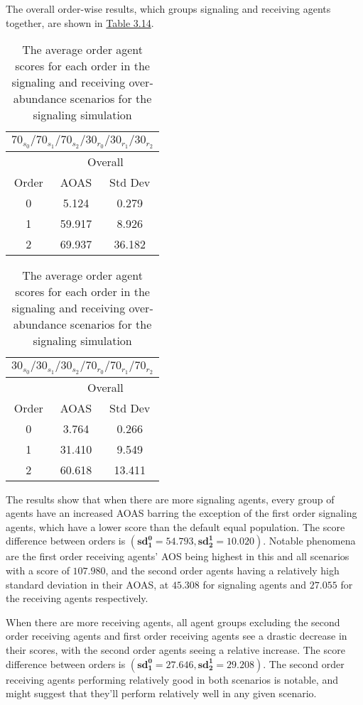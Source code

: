 The overall order-wise results, which groups signaling and receiving agents together, are shown in \hyperref[table:sig-overall]{Table 3.14}.

\begin{table}[h]
    \centering
    \begin{tabular}{|c|c|c|}
    \hline
    \multicolumn{3}{|c|}{$70_{s_{0}}/70_{s_{1}}/70_{s_{2}}/30_{r_{0}}/30_{r_{1}}/30_{r_{2}}$} \\
    \hline
    \multicolumn{1}{|c|}{} & \multicolumn{2}{|c|}{Overall} \\
    \hline
    Order & AOAS & Std Dev \\
    \hline
    0     & 5.124   & 0.279    \\ 
    1     & 59.917  & 8.926   \\
    2     & 69.937  & 36.182   \\ 
    \hline
    \end{tabular}
    \qquad
    \begin{tabular}{|c|c|c|}
    \hline
    \multicolumn{3}{|c|}{$30_{s_{0}}/30_{s_{1}}/30_{s_{2}}/70_{r_{0}}/70_{r_{1}}/70_{r_{2}}$} \\
    \hline
    \multicolumn{1}{|c|}{} & \multicolumn{2}{|c|}{Overall} \\
    \hline
    Order & AOAS & Std Dev \\
    \hline
    0     & 3.764   & 0.266    \\
    1     & 31.410  & 9.549   \\ 
    2     & 60.618  & 13.411   \\ 
    \hline
    \end{tabular}
    \caption{The average order agent scores for each order in the signaling and receiving over-abundance scenarios for the signaling simulation}
    \label{table:sig-overall}
\end{table}

The results show that when there are more signaling agents, every group of agents have an increased AOAS barring the exception of the first order signaling agents, which have a lower score than the default equal population. The score difference between orders is $(\mathbf{sd^0_1 = 54.793}, \mathbf{sd^1_2 = 10.020})$. Notable phenomena are the first order receiving agents' AOS being highest in this and all scenarios with a score of $\mathbf{107.980}$, and the second order agents having a relatively high standard deviation in their AOAS, at $\mathbf{45.308}$ for signaling agents and $\mathbf{27.055}$ for the receiving agents respectively. 

When there are more receiving agents, all agent groups excluding the second order receiving agents and first order receiving agents see a drastic decrease in their scores, with the second order agents seeing a relative increase. The score difference between orders is $(\mathbf{sd^0_1 = 27.646}, \mathbf{sd^1_2 = 29.208})$. The second order receiving agents performing relatively good in both scenarios is notable, and might suggest that they'll perform relatively well in any given scenario.

